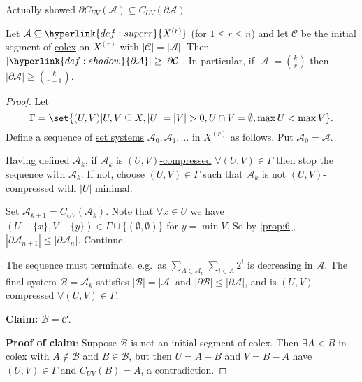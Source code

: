 \documentclass{article}
\let\subset\subseteq
\begin{document}
\begin{remark}
  Actually showed $\partial C_{UV}(\mathcal{A}) \subseteq C_{UV}(\partial\mathcal{A})$.
\end{remark}

\begin{nthm}\label{thm:kk7}
  Let $\mathcal{A} \subset \hyperlink{def:superr}{X^{(r)}}$ (for $1 \leq r \leq n$) and let $\mathcal{C}$ be the initial segment of \hyperlink{def:colex}{colex} on $X^{(r)}$ with $|\mathcal{C}| = |\mathcal{A}|$.
  Then $|\hyperlink{def:shadow}{\partial \mathcal{A}}| \geq |\partial \mathcal{C}|$.
  In particular, if $|\mathcal{A}| = \binom{k}{r}$ then $|\partial \mathcal{A}| \geq \binom{k}{r-1}$.
\end{nthm}
\begin{proof}
  Let
  \begin{equation*}
    \Gamma = \set{(U,V) | U,V \subset X, |U| = |V| > 0, U \cap V = \emptyset, \max U < \max V}.
  \end{equation*}
  Define a sequence of \hyperlink{def:ss}{set systems} $\mathcal{A}_0, \mathcal{A}_1, \dotsc$ in \hyperlink{def:superr}{$X^{(r)}$} as follows.
  Put $\mathcal{A}_0 = \mathcal{A}$.

  Having defined $\mathcal{A}_k$, if $\mathcal{A}_k$ is \hyperlink{def:uvcomp}{$(U,V)$-compressed} $\forall (U,V) \in \Gamma$ then stop the sequence with $\mathcal{A}_k$.
  If not, choose $(U,V) \in \Gamma$ such that $\mathcal{A}_k$ is not $(U,V)$-compressed with $|U|$ minimal.

  Set $\mathcal{A}_{k+1} = C_{UV}(\mathcal{A}_k)$.
  Note that $\forall x \in U$ we have $(U-\{x\}, V - \{y\}) \in \Gamma \cup \{(\emptyset,\emptyset)\}$ for $y = \min V$.
  So by \cref{prop:6}, $|\partial \mathcal{A}_{n+1}| \leq |\partial \mathcal{A}_n|$.
  Continue.

  The sequence must terminate, e.g.\ as $\sum_{A \in \mathcal{A}_n} \sum_{i \in A} 2^i$ is decreasing in $\mathcal{A}$.
  The final system $\mathcal{B} = \mathcal{A}_k$ satisfies $|\mathcal{B}| = |\mathcal{A}|$ and $|\partial \mathcal{B}| \leq |\partial \mathcal{A}|$, and is $(U,V)$-compressed $\forall (U,V) \in \Gamma$.

  \textbf{Claim:} $\mathcal{B} = \mathcal{C}$.

  \textbf{Proof of claim}: Suppose $\mathcal{B}$ is not an initial segment of colex.
  Then $\exists A < B$ in colex with $A \notin \mathcal{B}$ and $B \in \mathcal{B}$, but then $U = A-B$ and $V = B-A$ have $(U,V) \in \Gamma$ and $C_{UV}(B) = A$, a contradiction.
\end{proof}
\end{document}
